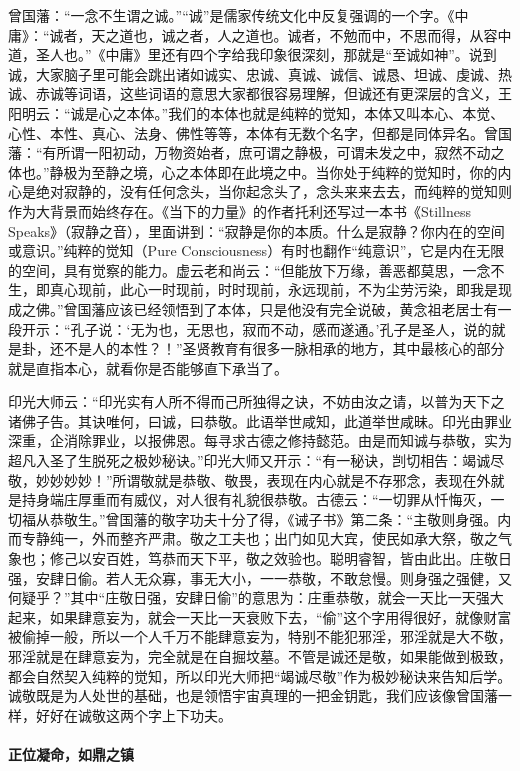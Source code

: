 曾国藩：“一念不生谓之诚。”“诚”是儒家传统文化中反复强调的一个字。《中庸》：“诚者，天之道也，诚之者，人之道也。诚者，不勉而中，不思而得，从容中道，圣人也。”《中庸》里还有四个字给我印象很深刻，那就是“至诚如神”。说到诚，大家脑子里可能会跳出诸如诚实、忠诚、真诚、诚信、诚恳、坦诚、虔诚、热诚、赤诚等词语，这些词语的意思大家都很容易理解，但诚还有更深层的含义，王阳明云：“诚是心之本体。”我们的本体也就是纯粹的觉知，本体又叫本心、本觉、心性、本性、真心、法身、佛性等等，本体有无数个名字，但都是同体异名。曾国藩：“有所谓一阳初动，万物资始者，庶可谓之静极，可谓未发之中，寂然不动之体也。”静极为至静之境，心之本体即在此境之中。当你处于纯粹的觉知时，你的内心是绝对寂静的，没有任何念头，当你起念头了，念头来来去去，而纯粹的觉知则作为大背景而始终存在。《当下的力量》的作者托利还写过一本书《Stillness Speaks》（寂静之音），里面讲到：“寂静是你的本质。什么是寂静？你内在的空间或意识。”纯粹的觉知（Pure Consciousness）有时也翻作“纯意识”，它是内在无限的空间，具有觉察的能力。虚云老和尚云：“但能放下万缘，善恶都莫思，一念不生，即真心现前，此心一时现前，时时现前，永远现前，不为尘劳污染，即我是现成之佛。”曾国藩应该已经领悟到了本体，只是他没有完全说破，黄念祖老居士有一段开示：“孔子说：‘无为也，无思也，寂而不动，感而遂通。’孔子是圣人，说的就是卦，还不是人的本性？！”圣贤教育有很多一脉相承的地方，其中最核心的部分就是直指本心，就看你是否能够直下承当了。

印光大师云：“印光实有人所不得而己所独得之诀，不妨由汝之请，以普为天下之诸佛子告。其诀唯何，曰诚，曰恭敬。此语举世咸知，此道举世咸昧。印光由罪业深重，企消除罪业，以报佛恩。每寻求古德之修持懿范。由是而知诚与恭敬，实为超凡入圣了生脱死之极妙秘诀。”印光大师又开示：“有一秘诀，剀切相告：竭诚尽敬，妙妙妙妙！”所谓敬就是恭敬、敬畏，表现在内心就是不存邪念，表现在外就是持身端庄厚重而有威仪，对人很有礼貌很恭敬。古德云：“一切罪从忏悔灭，一切福从恭敬生。”曾国藩的敬字功夫十分了得，《诫子书》第二条：“主敬则身强。内而专静纯一，外而整齐严肃。敬之工夫也；出门如见大宾，使民如承大祭，敬之气象也；修己以安百姓，笃恭而天下平，敬之效验也。聪明睿智，皆由此出。庄敬日强，安肆日偷。若人无众寡，事无大小，一一恭敬，不敢怠慢。则身强之强健，又何疑乎？”其中“庄敬日强，安肆日偷”的意思为：庄重恭敬，就会一天比一天强大起来，如果肆意妄为，就会一天比一天衰败下去，“偷”这个字用得很好，就像财富被偷掉一般，所以一个人千万不能肆意妄为，特别不能犯邪淫，邪淫就是大不敬，邪淫就是在肆意妄为，完全就是在自掘坟墓。不管是诚还是敬，如果能做到极致，都会自然契入纯粹的觉知，所以印光大师把“竭诚尽敬”作为极妙秘诀来告知后学。诚敬既是为人处世的基础，也是领悟宇宙真理的一把金钥匙，我们应该像曾国藩一样，好好在诚敬这两个字上下功夫。

\paragraph{正位凝命，如鼎之镇}

